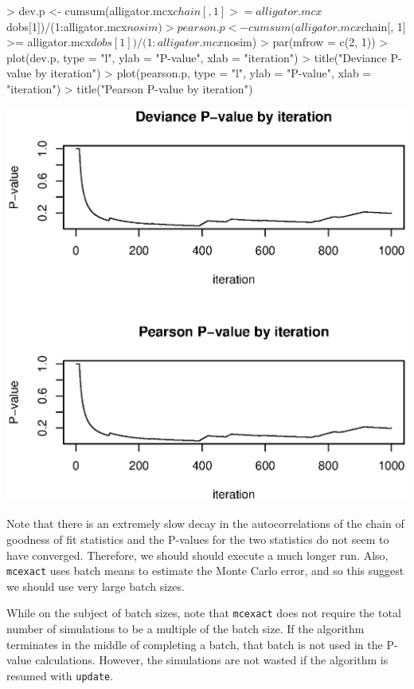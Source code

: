 \documentclass[a4paper]{article}
\newcommand{\mcexact}{\texttt{mcexact} }
\begin{document}
\begin{center}
\begin{Schunk}
\begin{Sinput}
> dev.p <- cumsum(alligator.mcx$chain[, 1] >= alligator.mcx$dobs[1])/(1:alligator.mcx$nosim)
> pearson.p <- cumsum(alligator.mcx$chain[, 1] >= alligator.mcx$dobs[1])/(1:alligator.mcx$nosim)
> par(mfrow = c(2, 1))
> plot(dev.p, type = "l", ylab = "P-value", xlab = "iteration")
> title("Deviance P-value by iteration")
> plot(pearson.p, type = "l", ylab = "P-value", xlab = "iteration")
> title("Pearson P-value by iteration")
\end{Sinput}
\end{Schunk}
\includegraphics{exactLoglinTest-012}
\end{center}
Note that there is an extremely slow decay in the autocorrelations of
the chain of goodness of fit statistics and the P-values for the two
statistics do not seem to have converged. Therefore, we should should
execute a much longer run. Also, \mcexact uses batch means to estimate
the Monte Carlo error, and so this suggest we should use very large
batch sizes. 

While on the subject of batch sizes, note that \mcexact does not
require the total number of simulations to be a multiple of the batch
size. If the algorithm terminates in the middle of completing a batch,
that batch is not used in the P-value calculations. However, the
simulations are not wasted if the algorithm is resumed with
\texttt{update}.
\end{document}
